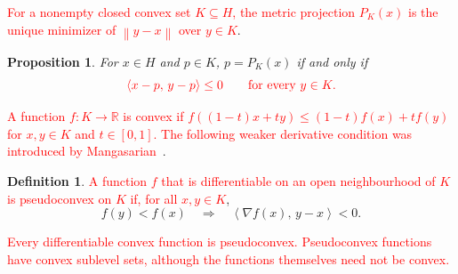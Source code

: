 \documentclass[]{interact}
\theoremstyle{plain}
\newtheorem{proposition}[theorem]{Proposition}
\theoremstyle{definition}
\newtheorem{definition}[theorem]{Definition}
\theoremstyle{remark}
\newcommand{\R}{\mathbb{R}}
\newcommand{\norm}[1]{\left\lVert #1 \right\rVert}
\newcommand{\inner}[2]{\left\langle #1,\, #2 \right\rangle}
\begin{document}
\leavevmode\textcolor{red}{For a nonempty closed convex set $K\subseteq H$, the metric projection $P_K(x)$ is the unique minimizer of $\norm{y-x}$ over $y\in K$}.
\begin{proposition}\label{prop:proj-char}
For $x\in H$ and $p\in K$, $p=P_K(x)$ if and only if
\begin{equation}\label{eq:proj-char}\textcolor{red}{
\inner{x-p}{y-p}\le0\qquad\text{for every }y\in K.
}\end{equation}
\end{proposition}

\leavevmode\textcolor{red}{A function $f:K\to\R$ is convex if $f((1-t)x+ty)\le(1-t)f(x)+tf(y)$ for $x,y\in K$ and $t\in[0,1]$. The following weaker derivative condition was introduced by Mangasarian~\citep{mangasarian1965}}.
\begin{definition}\label{def:pseudoconvex}
\leavevmode\textcolor{red}{A function $f$ that is differentiable on an open neighbourhood of $K$ is pseudoconvex on $K$ if, for all $x,y\in K$},
\begin{equation}\label{eq:contrapositive}
f(y)<f(x)\quad\Longrightarrow\quad\inner{\nabla f(x)}{y-x}<0.
\end{equation}
\end{definition}
\leavevmode\textcolor{red}{Every differentiable convex function is pseudoconvex. Pseudoconvex functions have convex sublevel sets, although the functions themselves need not be convex.}
\end{document}
